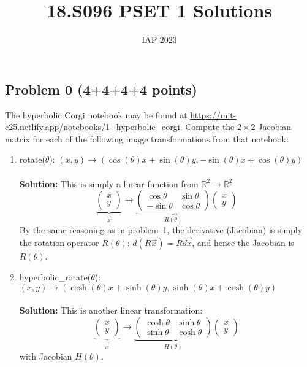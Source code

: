 \documentclass{article}
\title{18.S096 PSET 1 Solutions}
\author{IAP 2023}
\begin{document}
\maketitle

\subsection*{Problem 0 (4+4+4+4 points)}

The hyperbolic Corgi notebook may be found at 
\url{https://mit-c25.netlify.app/notebooks/1_hyperbolic_corgi}. 
Compute the $2 \times 2$ Jacobian matrix for each of the following image
transformations from that notebook:

\begin{enumerate}[label=(\alph*)]

\item rotate($\theta$):
$(x,y)\rightarrow 
(\cos(\theta)x + \sin(\theta)y, -\sin(\theta)x + \cos(\theta)y)$
\\
\\
\textbf{Solution:} This is simply a linear function from $\mathbb{R}^2 \to \mathbb{R}^2$
$$
\underbrace{\begin{pmatrix} x \\ y \end{pmatrix}}_{\vec{x}} \to \underbrace{\begin{pmatrix} \cos \theta & \sin \theta \\ -\sin \theta & \cos\theta \end{pmatrix}}_{R(\theta)} \begin{pmatrix} x \\ y \end{pmatrix}
$$
By the same reasoning as in problem~1, the derivative (Jacobian) is simply the rotation operator $R(\theta)$: $d(R\vec{x}) = R\vec{dx}$, and hence the Jacobian is $\boxed{R(\theta)}$.

\item hyperbolic\_rotate($\theta$): $(x,y)\rightarrow(\cosh(\theta)x+\sinh(\theta)y,\sinh(\theta)x + \cosh(\theta)y )$
\\
\\
\textbf{Solution:} This is another linear transformation:
$$
\underbrace{\begin{pmatrix} x \\ y \end{pmatrix}}_{\vec{x}} \to \underbrace{\begin{pmatrix} \cosh \theta & \sinh \theta \\ \sinh \theta & \cosh\theta \end{pmatrix}}_{H(\theta)} \begin{pmatrix} x \\ y \end{pmatrix}
$$
with Jacobian $\boxed{H(\theta)}$.


\end{enumerate}
\end{document}
